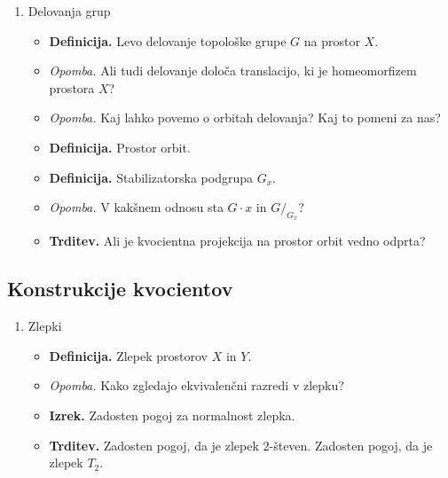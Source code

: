 \begin{enumerate}
    \item Delovanja grup
    \begin{itemize}
        \item \colorbox{purple!30}{\textbf{Definicija.}} Levo delovanje topološke grupe \(G\) na prostor \(X\).
        \item \colorbox{yellow!30}{\emph{Opomba.}} Ali tudi delovanje določa translacijo, ki je homeomorfizem prostora \(X\)?
        \item \colorbox{yellow!30}{\emph{Opomba.}} Kaj lahko povemo o orbitah delovanja? Kaj to pomeni za nas?
        \item \colorbox{purple!30}{\textbf{Definicija.}} Prostor orbit.
        \item \colorbox{purple!30}{\textbf{Definicija.}} Stabilizatorska podgrupa \(G_x\).
        \item \colorbox{yellow!30}{\emph{Opomba.}} V kakšnem odnosu sta \(G \cdot x\) in \(G/_{G_x}\)?
        \item \colorbox{blue!30}{\textbf{Trditev.}} Ali je kvocientna projekcija na prostor orbit vedno odprta?
    \end{itemize}
\end{enumerate}

\subsection{Konstrukcije kvocientov}
\begin{enumerate}
    \item Zlepki
    \begin{itemize}
        \item \colorbox{purple!30}{\textbf{Definicija.}} Zlepek prostorov \(X\) in \(Y\).
        \item \colorbox{yellow!30}{\emph{Opomba.}} Kako zgledajo ekvivalenčni razredi v zlepku?
        \item \colorbox{blue!30}{\textbf{Izrek.}} Zadosten pogoj za normalnost zlepka.
        \item \colorbox{blue!30}{\textbf{Trditev.}} Zadosten pogoj, da je zlepek \(2\)-števen. Zadosten pogoj, da je zlepek \(T_2\).
    \end{itemize}
\end{enumerate}